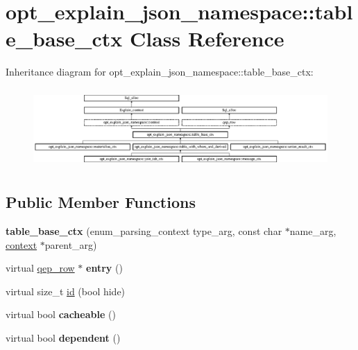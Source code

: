 \hypertarget{classopt__explain__json__namespace_1_1table__base__ctx}{}\section{opt\+\_\+explain\+\_\+json\+\_\+namespace\+:\+:table\+\_\+base\+\_\+ctx Class Reference}
\label{classopt__explain__json__namespace_1_1table__base__ctx}
Inheritance diagram for opt\+\_\+explain\+\_\+json\+\_\+namespace\+:\+:table\+\_\+base\+\_\+ctx\+:\begin{figure}[H]
\begin{center}
\leavevmode
\includegraphics[height=3.051771cm]{classopt__explain__json__namespace_1_1table__base__ctx}
\end{center}
\end{figure}
\subsection*{Public Member Functions}
\begin{DoxyCompactItemize}
\item 
\mbox{\label{classopt__explain__json__namespace_1_1table__base__ctx_a7cbf4cdc58460cd3780ccf16c1640533}} 
{\bfseries table\+\_\+base\+\_\+ctx} (enum\+\_\+parsing\+\_\+context type\+\_\+arg, const char $\ast$name\+\_\+arg, \mbox{\hyperlink{classopt__explain__json__namespace_1_1context}{context}} $\ast$parent\+\_\+arg)
\item 
\mbox{\label{classopt__explain__json__namespace_1_1table__base__ctx_a88ebc0972f2d02d21ca39c1b5d62d8c6}} 
virtual \mbox{\hyperlink{classqep__row}{qep\+\_\+row}} $\ast$ {\bfseries entry} ()
\item 
virtual size\+\_\+t \mbox{\hyperlink{classopt__explain__json__namespace_1_1table__base__ctx_afc1c98638ff3c4cc5b33ef99164cb144}{id}} (bool hide)
\item 
\mbox{\label{classopt__explain__json__namespace_1_1table__base__ctx_ac586c52dedb8e2907b73c06ad100a0a8}} 
virtual bool {\bfseries cacheable} ()
\item 
\mbox{\label{classopt__explain__json__namespace_1_1table__base__ctx_a39fb61dc9ea8a5e7bd30d784de020fc8}} 
virtual bool {\bfseries dependent} ()
\end{DoxyCompactItemize}
